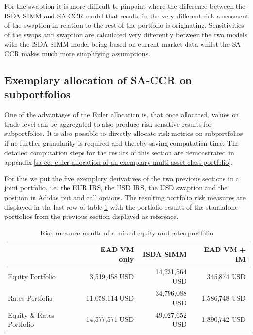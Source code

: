 \documentclass[../Thesis_AHoecherl.tex]{subfiles}
\begin{document}
    For the swaption it is more difficult to pinpoint where the difference between the \gls{ISDA SIMM} and \gls{SA-CCR} model that results in the very different risk assessment of the swaption in relation to the rest of the portfolio is originating.
    Sensitivities of the swaps and swaption are calculated very differently between the two models with the \gls{ISDA SIMM} model being based on current market data whilst the \gls{SA-CCR} makes much more simplifying assumptions.

    \subsection{Exemplary allocation of SA-CCR on subportfolios\label{sec:Exemplary allocation of SA-CCR on subportfolios}}

    One of the advantages of the Euler allocation is, that once allocated, values on trade level can be aggregated to also produce risk sensitive results for subportfolios. It is also possible to directly allocate risk metrics on subportfolios if no further granularity is required and thereby saving computation time. The detailed computation steps for the results of this section are demonstrated in appendix \ref{sa-ccr-euler-allocation-of-an-exemplary-multi-asset-class-portfolio}.

    For this we put the five exemplary derivatives of the two previous sections in a joint portfolio, i.e. the EUR \gls{IRS}, the USD \gls{IRS}, the USD swaption and the position in Adidas put and call options.
    The resulting portfolio risk measures are displayed in the last row of table \ref{tab:multiAssetResult} with the portfolio results of the standalone portfolios from the previous section displayed as reference.

    \begin{table}[htbp]
        \centering
        \begin{tabular}{l||r|r|r}
                & \gls{EAD} \gls{VM} only &\gls{ISDA SIMM} & \gls{EAD} \gls{VM} + \gls{IM} \\
                \toprule
        Equity Portfolio & 3,519,458 USD & 14,231,564 USD & 345,874 USD \\
        Rates Portfolio & 11,058,114 USD & 34,796,088 USD & 1,586,748 USD \\
        \midrule
        Equity \& Rates Portfolio & 14,577,571 USD & 49,027,652  USD & 1,890,742 USD \\
        \end{tabular}%
        \caption{Risk measure results of a mixed equity and rates portfolio}
        \label{tab:multiAssetResult}%
    \end{table}%
\end{document}
